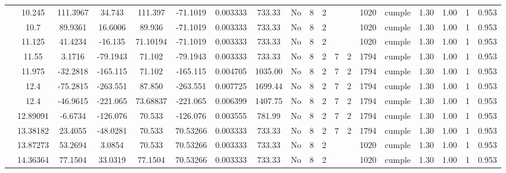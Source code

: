 \begin{table}[H]
{\begin{tabular}{|c|c|c|c|c|c|r|c|c|c|c|c|c|c|c|c|c|c|c|}
\cline{2-19}    & 10.245 & 111.3967 & 34.743 & 111.397 & -71.1019 & 0.003333 & 733.33 & No  & 8   & 2   &     &     & 1020 & \cellcolor[rgb]{ .776,  .937,  .808}cumple & 1.30 & 1.00 & 1   & 0.953 \bigstrut\\
\cline{2-19}    & 10.7 & 89.9361 & 16.6006 & 89.936 & -71.1019 & 0.003333 & 733.33 & No  & 8   & 2   &     &     & 1020 & \cellcolor[rgb]{ .776,  .937,  .808}cumple & 1.30 & 1.00 & 1   & 0.953 \bigstrut\\
\cline{2-19}    & 11.125 & 41.4234 & -16.135 & 71.10194 & -71.1019 & 0.003333 & 733.33 & No  & 8   & 2   &     &     & 1020 & \cellcolor[rgb]{ .776,  .937,  .808}cumple & 1.30 & 1.00 & 1   & 0.953 \bigstrut\\
\cline{2-19}    & 11.55 & 3.1716 & -79.1943 & 71.102 & -79.1943 & 0.003333 & 733.33 & No  & 8   & 2   & 7   & 2   & 1794 & \cellcolor[rgb]{ .776,  .937,  .808}cumple & 1.30 & 1.00 & 1   & 0.953 \bigstrut\\
\cline{2-19}    & 11.975 & -32.2818 & -165.115 & 71.102 & -165.115 & 0.004705 & 1035.00 & No  & 8   & 2   & 7   & 2   & 1794 & \cellcolor[rgb]{ .776,  .937,  .808}cumple & 1.30 & 1.00 & 1   & 0.953 \bigstrut\\
\cline{2-19}    & \cellcolor[rgb]{ .851,  .882,  .949}12.4 & -75.2815 & -263.551 & 87.850 & -263.551 & 0.007725 & 1699.44 & No  & 8   & 2   & 7   & 2   & 1794 & \cellcolor[rgb]{ .776,  .937,  .808}cumple & 1.30 & 1.00 & 1   & 0.953 \bigstrut\\
\cline{2-19}    & \cellcolor[rgb]{ .851,  .882,  .949}12.4 & -46.9615 & -221.065 & 73.68837 & -221.065 & 0.006399 & 1407.75 & No  & 8   & 2   & 7   & 2   & 1794 & \cellcolor[rgb]{ .776,  .937,  .808}cumple & 1.30 & 1.00 & 1   & 0.953 \bigstrut\\
\cline{2-19}    & 12.89091 & -6.6734 & -126.076 & 70.533 & -126.076 & 0.003555 & 781.99 & No  & 8   & 2   & 7   & 2   & 1794 & \cellcolor[rgb]{ .776,  .937,  .808}cumple & 1.30 & 1.00 & 1   & 0.953 \bigstrut\\
\cline{2-19}    & 13.38182 & 23.4055 & -48.0281 & 70.533 & 70.53266 & 0.003333 & 733.33 & No  & 8   & 2   & 7   & 2   & 1794 & \cellcolor[rgb]{ .776,  .937,  .808}cumple & 1.30 & 1.00 & 1   & 0.953 \bigstrut\\
\cline{2-19}    & 13.87273 & 53.2694 & 3.0854 & 70.533 & 70.53266 & 0.003333 & 733.33 & No  & 8   & 2   &     &     & 1020 & \cellcolor[rgb]{ .776,  .937,  .808}cumple & 1.30 & 1.00 & 1   & 0.953 \bigstrut\\
\cline{2-19}    & 14.36364 & 77.1504 & 33.0319 & 77.1504 & 70.53266 & 0.003333 & 733.33 & No  & 8   & 2   &     &     & 1020 & \cellcolor[rgb]{ .776,  .937,  .808}cumple & 1.30 & 1.00 & 1   & 0.953 \bigstrut\\

\end{tabular}}
\end{table}
